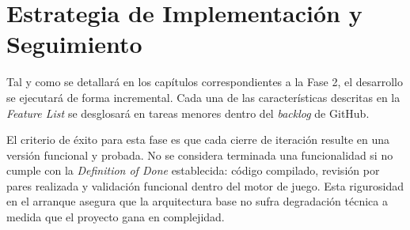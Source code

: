 \section{Estrategia de Implementación y Seguimiento}
Tal y como se detallará en los capítulos correspondientes a la Fase 2, el desarrollo se ejecutará de forma incremental. Cada una de las características descritas en la \textit{Feature List} se desglosará en tareas menores dentro del \textit{backlog} de GitHub.

El criterio de éxito para esta fase es que cada cierre de iteración resulte en una versión funcional y probada. No se considera terminada una funcionalidad si no cumple con la \textit{Definition of Done} establecida: código compilado, revisión por pares realizada y validación funcional dentro del motor de juego. Esta rigurosidad en el arranque asegura que la arquitectura base no sufra degradación técnica a medida que el proyecto gana en complejidad.
